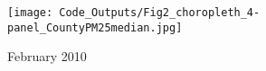 
\begin{figure} 
\centering  
\texttt{[image: Code\_Outputs/Fig2\_choropleth\_4-panel\_CountyPM25median.jpg]} 
\caption{\label{fig:Fig2_choropleth_4-panelCountyPM25median}February 2010} 
\end{figure} 
 
